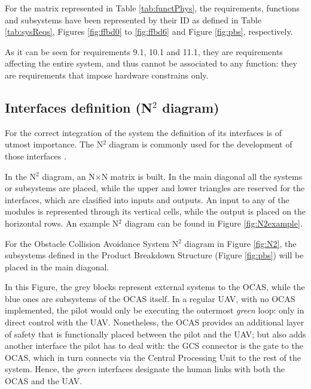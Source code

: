 For the matrix represented in Table \ref{tab:functPhys}, the requirements, functions and subsystems have been represented by their ID as defined in Table \ref{tab:sysReqs}, Figures \ref{fig:ffbd0} to \ref{fig:ffbd6} and Figure \ref{fig:pbs}, respectively.



As it can be seen for requirements 9.1, 10.1 and 11.1, they are requirements affecting the entire system, and thus cannot be associated to any function: they are requirements that impose hardware constrains only.

\subsection{Interfaces definition (N$^2$ diagram)} \label{sec:interfaces}

For the correct integration of the system the definition of its interfaces is of utmost importance.
The N$^2$ diagram is commonly used for the development of those interfaces \cite{faulconbridge2003}.

In the N$^2$ diagram, an N$\times$N matrix is built.
In the main diagonal all the systems or subsystems are placed, while the upper and lower triangles are reserved for the interfaces, which are clasified into inputs and outputs.
An input to any of the modules is represented through its vertical cells, while the output is placed on the horizontal rows.
An example N$^2$ diagram can be found in Figure \ref{fig:N2example}.



For the Obstacle Collision Avoidance System N$^2$ diagram in Figure \ref{fig:N2}, the subsystems defined in the Product Breakdown Structure (Figure \ref{fig:pbs}) will be placed in the main diagonal.



In this Figure, the grey blocks represent external systems to the OCAS, while the blue ones are subsystems of the OCAS itself.
In a regular UAV, with no OCAS implemented, the pilot would only be executing the outermost \emph{green} loop: only in direct control with the UAV.
Nonetheless, the OCAS provides an additional layer of safety that is functionally placed between the pilot and the UAV; but also adds another interface the pilot has to deal with: the GCS connector is the gate to the OCAS, which in turn connects via the Central Processing Unit to the rest of the system.
Hence, the \emph{green} interfaces designate the human links with both the OCAS and the UAV.

